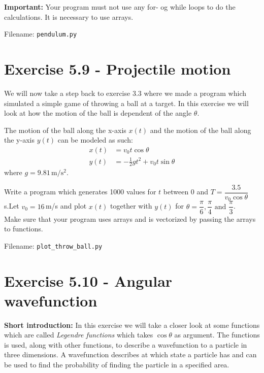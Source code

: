 \documentclass[10pt,a4paper]{article}
\begin{document}
\textbf{Important:} Your program must not use any for- og while loops to do the calculations. It is necessary to use arrays. 

Filename: \texttt{pendulum.py}




\section*{Exercise 5.9 - Projectile motion}
We will now take a step back to exercise 3.3 where we made a program which simulated a simple game of throwing a ball at a target. In this exercise we will look at how the motion of the ball is dependent of the angle $\theta$. 

The motion of the ball along the x-axis $x(t)$ and the motion of the ball along the y-axis $y(t)$ can be modeled as such:
\begin{align*}
	x(t) &= v_0t\cos\theta \\
	y(t) &= -\frac{1}{2}g t^2 + v_0t\sin\theta
\end{align*}
where $g = 9.81\,\mathrm{m/s^2}$. 

Write a program which generates 1000 values for $t$ between 0 and  $T = \dfrac{3.5 }{v_0\cos\theta}\,$s.Let $v_0 = 16\,$m/s and plot $x(t)$ together with $y(t)$ for $\theta = \dfrac{\pi}{6},\dfrac{\pi}{4} \text{ and }\dfrac{\pi}{3}$.  \\
Make sure that your program uses arrays and is vectorized by passing the arrays to  functions.

Filename: \texttt{plot\_throw\_ball.py}




\section*{Exercise 5.10 - Angular wavefunction}

\textbf{Short introduction:} In this exercise we will take a closer look at some functions which are called \textit{Legendre functions} which takes $\cos\theta$ as argument. The functions is used, along with other functions, to describe a wavefunction to a particle in three dimensions. A wavefunction describes at which state a particle has and can be used to find the probability of finding the particle in a specified area. 
\end{document}
